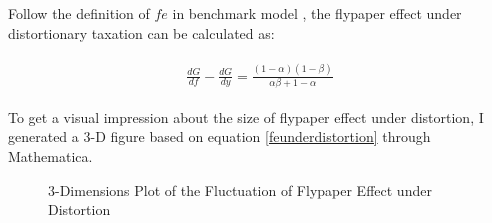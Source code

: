 Follow the definition of $fe$ in benchmark model , the flypaper effect under distortionary taxation can be calculated as:

\begin{align}
    \begin{split}
        \frac{d G}{d f}-\frac{d G}{d y}=\frac{(1-\alpha)(1-\beta)}{\alpha \beta+1-\alpha}  \label{feunderdistortion}
    \end{split}
\end{align}

To get a visual impression about the size of flypaper effect under distortion, I generated a 3-D figure based on equation \ref*{feunderdistortion} through Mathematica.

\begin{figure}[htbp]
    \centering
    \caption{3-Dimensions Plot of the Fluctuation of Flypaper Effect under Distortion}
    \label{figfeunderdistortion}
\end{figure}

